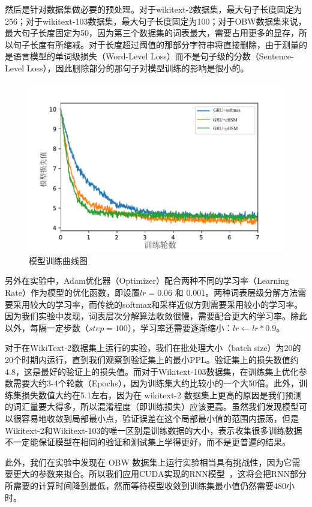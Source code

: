 然后是针对数据集做必要的预处理。对于wikitext-2数据集，最大句子长度固定为256；对于wikitext-103数据集，最大句子长度固定为100；对于OBW数据集来说，最大句子长度固定为50，因为第三个数据集的词表最大，需要占用更多的显存，所以句子长度有所缩减。对于长度超过阈值的那部分字符串将直接删除，由于测量的是语言模型的单词级损失（Word-Level Loss）而不是句子级的分数（Sentence-Level Loss），因此删除部分的那句子对模型训练的影响是很小的。
\begin{figure}[!ht]
  \centering
  \includegraphics[width=0.6\columnwidth]{./figures/learn2.pdf}
  \caption{模型训练曲线图}
\end{figure}

另外在实验中，Adam优化器（Optimizer）配合两种不同的学习率（Learning Rate）作为模型的优化函数，即设置$ lr = 0.06$ 和 $0.001 $。两种词表层级分解方法需要采用较大的学习率，而传统的softmax和采样近似方则需要采用较小的学习率。因为我们实验中发现，词表层次分解算法收敛很慢，需要配合更大的学习率。除此以外，每隔一定步数（$step=100$），学习率还需要逐渐缩小：$lr \leftarrow lr *0.9$。

对于在WikiText-2数据集上运行的实验，我们在批处理大小（batch size）为20的20个时期内运行，直到我们观察到验证集上的最小$ \mathrm{PPL} $。验证集上的损失数值约4.8，这是最好的验证上的损失值。而对于Wikitext-103数据集，在训练集上优化参数需要大约3-4个轮数（Epochs），因为训练集大约比较小的一个大50倍。此外，训练集损失数值大约在5.1左右，因为在 wikitext-2 数据集上更高的原因是我们预测的词汇量要大得多，所以混淆程度（即训练损失）应该更高。虽然我们发现模型可以很容易地收敛到局部最小点，验证误差在这个局部最小值的范围内振荡，但是Wikitext-2和Wikitext-103的唯一区别是训练数据的大小，表示收集很多训练数据不一定能保证模型在相同的验证和测试集上学得更好，而不是更普遍的结果。

此外，我们在实验中发现在 OBW 数据集上运行实验相当具有挑战性，因为它需要更大的参数来拟合。所以我们应用CUDA实现的RNN模型~，这将会把RNN部分所需要的计算时间降到最低，然而等待模型收敛到训练集最小值仍然需要480小时。

